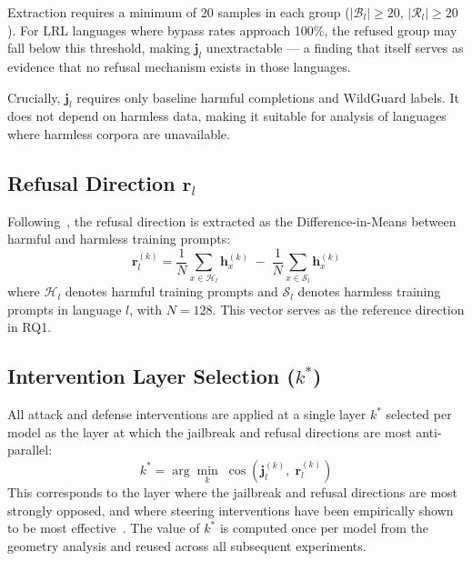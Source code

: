 Extraction requires a minimum of 20 samples in each group ($|\mathcal{B}_l| \geq 20$, $|\mathcal{R}_l| \geq 20$). For LRL languages where bypass rates approach 100\%, the refused group may fall below this threshold, making $\mathbf{j}_l$ unextractable — a finding that itself serves as evidence that no refusal mechanism exists in those languages.

Crucially, $\mathbf{j}_l$ requires only baseline harmful completions and WildGuard labels. It does not depend on harmless data, making it suitable for analysis of languages where harmless corpora are unavailable.

\subsection{Refusal Direction \texorpdfstring{$\mathbf{r}_l$}{r\_l}}
\label{sec:rl}

Following~\citet{arditi2024refusal}, the refusal direction is extracted as the Difference-in-Means between harmful and harmless training prompts:
%
\begin{equation}
    \mathbf{r}_l^{(k)} =
        \frac{1}{N} \sum_{x \in \mathcal{H}_l} \mathbf{h}_x^{(k)}
        \;-\;
        \frac{1}{N} \sum_{x \in \mathcal{S}_l} \mathbf{h}_x^{(k)}
    \label{eq:rl}
\end{equation}
%
where $\mathcal{H}_l$ denotes harmful training prompts and $\mathcal{S}_l$ denotes harmless training prompts in language $l$, with $N = 128$. This vector serves as the reference direction in RQ1.

\subsection{Intervention Layer Selection \texorpdfstring{($k^*$)}{(k*)}}
\label{sec:kstar}

All attack and defense interventions are applied at a single layer $k^*$ selected per model as the layer at which the jailbreak and refusal directions are most anti-parallel:
%
\begin{equation}
    k^* = \arg\min_k \;\cos\!\left(\mathbf{j}_l^{(k)},\; \mathbf{r}_l^{(k)}\right)
    \label{eq:kstar}
\end{equation}
%
This corresponds to the layer where the jailbreak and refusal directions are most strongly opposed, and where steering interventions have been empirically shown to be most effective~\citep{arditi2024refusal}. The value of $k^*$ is computed once per model from the geometry analysis and reused across all subsequent experiments.


